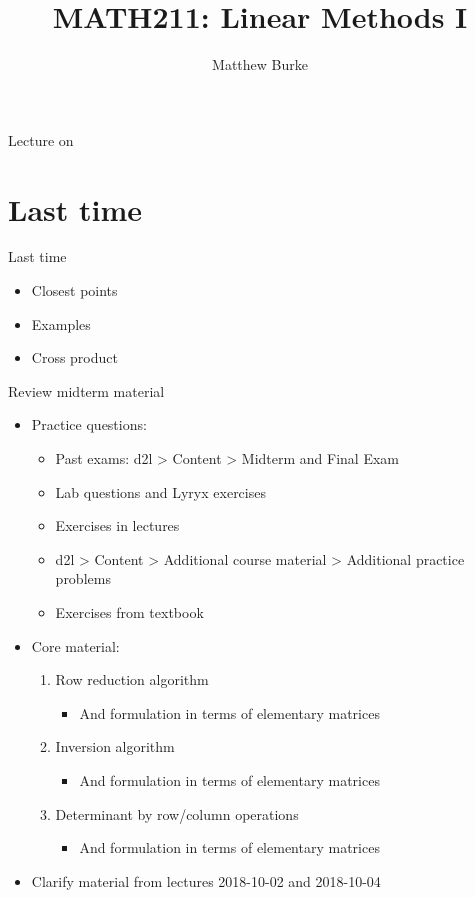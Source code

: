 \documentclass{beamer}
\title{MATH211: Linear Methods I}
\author{Matthew Burke}
\date{\lectureDate}
\newcommand{\lectureDate}{\formatdate{23}{10}{2018}}
\begin{document}
\frame{\titlepage}

\begin{frame}{Lecture on \lectureDate}
  \tableofcontents
\end{frame}

\section*{Last time}
\label{sec:Last-time}

\begin{frame}{Last time}
  \begin{itemize}
  \item Closest points\vfill
  \item Examples\vfill
  \item Cross product
  \end{itemize}
\end{frame}

\begin{frame}{Review midterm material}
\begin{itemize}
  \item Practice questions:
  \begin{itemize}
    \item Past exams: d2l > Content > Midterm and Final Exam
    \item Lab questions and Lyryx exercises
    \item Exercises in lectures
    \item d2l > Content > Additional course material > Additional practice problems
    \item Exercises from textbook
  \end{itemize}
  \item Core material:
  \begin{enumerate}
    \item Row reduction algorithm
    \begin{itemize}
      \item And formulation in terms of elementary matrices
    \end{itemize}
    \item Inversion algorithm
    \begin{itemize}
      \item And formulation in terms of elementary matrices
    \end{itemize}
    \item Determinant by row/column operations
    \begin{itemize}
      \item And formulation in terms of elementary matrices
    \end{itemize}
  \end{enumerate}
	\item Clarify material from lectures 2018-10-02 and 2018-10-04
\end{itemize}
\end{frame}
\end{document}
